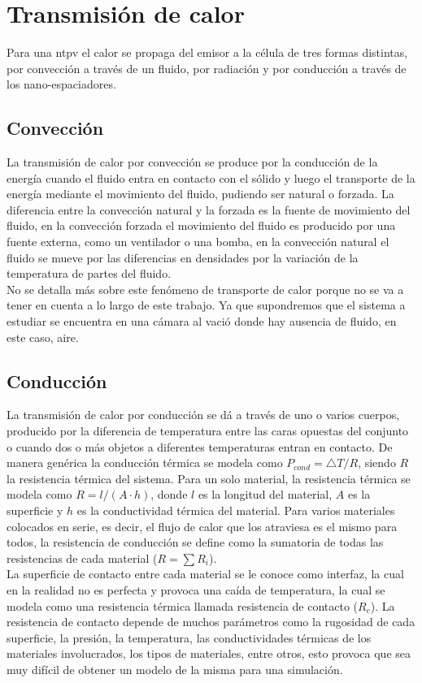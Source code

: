 \section{Transmisión de calor}
Para una \acrshort{ntpv} el calor se propaga del emisor a la célula de tres formas distintas, por convección a través de un fluido, por radiación y por conducción a través de los nano-espaciadores.
\subsection{Convección}
La transmisión de calor por convección se produce por la conducción de la energía cuando el fluido entra en contacto con el sólido y luego el transporte de la energía mediante el movimiento del fluido, pudiendo ser natural o forzada. La diferencia entre la convección natural y la forzada es la fuente de movimiento del fluido, en la convección forzada el movimiento del fluido es producido por una fuente externa, como un ventilador o una bomba, en la convección natural el fluido se mueve por las diferencias en densidades por la variación de la temperatura de partes del fluido.\\

No se detalla más sobre este fenómeno de transporte de calor porque no se va a tener en cuenta a lo largo de este trabajo. Ya que supondremos que el sistema a estudiar se encuentra en una cámara al vació donde hay ausencia de fluido, en este caso, aire.
\subsection{Conducción}
La transmisión de calor por conducción se dá a través de uno o varios cuerpos, producido por la diferencia de temperatura entre las caras opuestas del conjunto o cuando dos o más objetos a diferentes temperaturas entran en contacto. De manera genérica la conducción térmica se modela como $P_{cond}={\bigtriangleup T}/{R} $, siendo $R$ la resistencia térmica del sistema.
Para un solo material, la resistencia térmica se modela como $R = l/{\left(A\cdot h\right)}$, donde $l$ es la longitud del material, $A$ es la superficie y $h$ es la conductividad térmica del material. Para varios materiales colocados en serie, es decir, el flujo de calor que los atraviesa es el mismo para todos, la resistencia de conducción se define como la sumatoria de todas las resistencias de cada material ($R=\sum R_i$).\\

La superficie de contacto entre cada material se le conoce como interfaz, la cual en la realidad no es perfecta y provoca una caída de temperatura, la cual se modela como una resistencia térmica llamada resistencia de contacto ($R_c$). La resistencia de contacto depende de muchos parámetros como la rugosidad de cada superficie, la presión, la temperatura, las conductividades térmicas de los materiales involucrados, los tipos de materiales, entre otros, esto provoca que sea muy difícil de obtener un modelo de la misma para una simulación.\\

